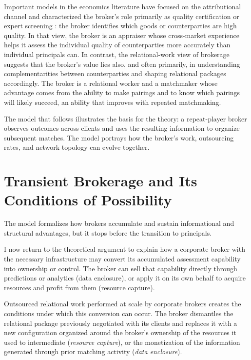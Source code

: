 \documentclass[
]{article}
\begin{document}
Important models in the economics literature have focused on the attributional channel and characterized the broker's role primarily as quality certification \autocite{liMiddlemenPrivateInformation1998} or expert screening \autocite{bethuneInformationbasedTheoryFinancial2022a}: the broker identifies which goods or counterparties are high quality. In that view, the broker is an appraiser whose cross-market experience helps it assess the individual quality of counterparties more accurately than individual principals can. In contrast, the relational-work view of brokerage suggests that the broker's value lies also, and often primarily, in understanding complementarities between counterparties and shaping relational packages accordingly. The broker is a relational worker and a matchmaker whose advantage comes from the ability to make pairings and to know which pairings will likely succeed, an ability that improves with repeated matchmaking.

The model that follows illustrates the basis for the theory: a repeat-player broker observes outcomes across clients and uses the resulting information to organize subsequent matches. The model portrays how the broker's work, outsourcing rates, and network topology can evolve together.



\section{Transient Brokerage and Its Conditions of Possibility}
\label{sec:transient-brokerage}

The model formalizes how brokers accumulate and sustain informational and structural advantages, but it stops before the transition to principals.

I now return to the theoretical argument to explain how a corporate broker with the necessary infrastructure may convert its accumulated assessment capability into ownership or control. The broker can sell that capability directly through predictions or analytics (data enclosure), or apply it on its own behalf to acquire resources and profit from them (resource capture).

Outsourced relational work performed at scale by corporate brokers creates the conditions under which this conversion can occur. The broker dismantles the relational package previously negotiated with its clients and replaces it with a new configuration organized around the broker's ownership of the resources it used to intermediate (\emph{resource capture}), or the monetization of the information generated through prior matching activity (\emph{data enclosure}).
\end{document}
